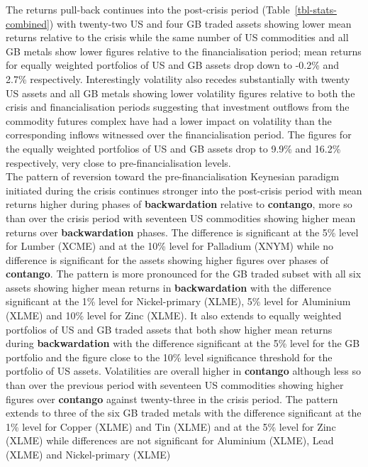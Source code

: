 \documentclass[
  authoryear,
  preprint,
  3p]{elsarticle}
\begin{document}
The returns pull-back continues into the post-crisis period
(Table~\ref{tbl-stats-combined}) with twenty-two US and four GB traded
assets showing lower mean returns relative to the crisis while the same
number of US commodities and all GB metals show lower figures relative
to the financialisation period; mean returns for equally weighted
portfolios of US and GB assets drop down to -0.2\% and 2.7\%
respectively. Interestingly volatility also recedes substantially with
twenty US assets and all GB metals showing lower volatility figures
relative to both the crisis and financialisation periods suggesting that
investment outflows from the commodity futures complex have had a lower
impact on volatility than the corresponding inflows witnessed over the
financialisation period. The figures for the equally weighted portfolios
of US and GB assets drop to 9.9\% and 16.2\% respectively, very close to
pre-financialisation levels.\\
The pattern of reversion toward the pre-financialisation Keynesian
paradigm initiated during the crisis continues stronger into the
post-crisis period with mean returns higher during phases of
\textbf{backwardation} relative to \textbf{contango}, more so than over
the crisis period with seventeen US commodities showing higher mean
returns over \textbf{backwardation} phases. The difference is
significant at the 5\% level for Lumber (XCME) and at the 10\% level for
Palladium (XNYM) while no difference is significant for the assets
showing higher figures over phases of \textbf{contango}. The pattern is
more pronounced for the GB traded subset with all six assets showing
higher mean returns in \textbf{backwardation} with the difference
significant at the 1\% level for Nickel-primary (XLME), 5\% level for
Aluminium (XLME) and 10\% level for Zinc (XLME). It also extends to
equally weighted portfolios of US and GB traded assets that both show
higher mean returns during \textbf{backwardation} with the difference
significant at the 5\% level for the GB portfolio and the figure close
to the 10\% level significance threshold for the portfolio of US assets.
Volatilities are overall higher in \textbf{contango} although less so
than over the previous period with seventeen US commodities showing
higher figures over \textbf{contango} against twenty-three in the crisis
period. The pattern extends to three of the six GB traded metals with
the difference significant at the 1\% level for Copper (XLME) and Tin
(XLME) and at the 5\% level for Zinc (XLME) while differences are not
significant for Aluminium (XLME), Lead (XLME) and Nickel-primary (XLME)
\end{document}
